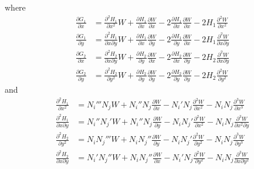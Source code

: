 \documentclass[twoside, 11pt, a4paper]{article}
\begin{document}
where
\[
  \begin{split}
    \frac{\partial G_1}{\partial x} &= \frac{\partial^2H_1}{\partial x^2}W + \frac{\partial H_1}{\partial x}\frac{\partial W}{\partial x} - 2\frac{\partial H_1}{\partial x}\frac{\partial W}{\partial x} - 2 H_1\frac{\partial^2W}{\partial x^2} \\
    \frac{\partial G_1}{\partial y} &= \frac{\partial^2H_1}{\partial x\partial y}W + \frac{\partial H_1}{\partial x}\frac{\partial W}{\partial y} - 2\frac{\partial H_1}{\partial y}\frac{\partial W}{\partial x} - 2 H_1\frac{\partial^2W}{\partial x\partial y} \\
    \frac{\partial G_2}{\partial x} &= \frac{\partial^2H_2}{\partial x\partial y}W + \frac{\partial H_2}{\partial y}\frac{\partial W}{\partial x} - 2\frac{\partial H_2}{\partial x}\frac{\partial W}{\partial y} - 2 H_2\frac{\partial^2W}{\partial x\partial y} \\
    \frac{\partial G_2}{\partial y} &= \frac{\partial^2H_2}{\partial y^2}W + \frac{\partial H_2}{\partial y}\frac{\partial W}{\partial y} - 2\frac{\partial H_2}{\partial y}\frac{\partial W}{\partial y} - 2 H_2\frac{\partial^2W}{\partial y^2}
  \end{split}
\]
and
\[
  \begin{split}
    \frac{\partial^2H_1}{\partial x^2} &= N_i'''N_jW + N_i''N_j\frac{\partial W}{\partial x} - N_i'N_j\frac{\partial^2W}{\partial x^2} - N_iN_j\frac{\partial^3W}{\partial x^3} \\
    \frac{\partial^2H_1}{\partial x\partial y} &= N_i''N_j'W + N_i''N_j\frac{\partial W}{\partial y} - N_iN_j'\frac{\partial^2W}{\partial x^2} - N_iN_j\frac{\partial^3W}{\partial x^2\partial y} \\
    \frac{\partial^2H_2}{\partial y^2} &= N_iN_j'''W + N_iN_j''\frac{\partial W}{\partial y} - N_iN_j'\frac{\partial^2W}{\partial y^2} - N_iN_j\frac{\partial^3W}{\partial y^3} \\
    \frac{\partial^2H_2}{\partial x\partial y} &= N_i'N_j''W + N_iN_j''\frac{\partial W}{\partial x} - N_i'N_j\frac{\partial^2W}{\partial y^2} - N_iN_j\frac{\partial^3W}{\partial x\partial y^2}
  \end{split}
\]
\end{document}

